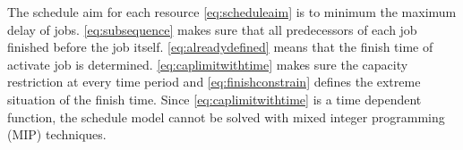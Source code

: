 The schedule aim for each resource \autoref{eq:scheduleaim} is to minimum the maximum delay of jobs. \autoref{eq:subsequence} makes sure that all predecessors of each job finished before the job itself. \autoref{eq:alreadydefined} means that the finish time of activate job is determined. \autoref{eq:caplimitwithtime} makes sure the capacity restriction at every time period and \autoref{eq:finishconstrain} defines the extreme situation of the finish time.
Since \autoref{eq:caplimitwithtime} is a time dependent function, the schedule model cannot be
solved with mixed integer programming (MIP) techniques.




